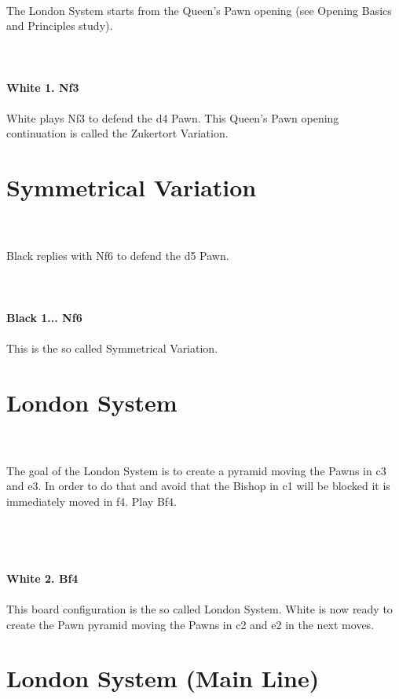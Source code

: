 \documentclass{article}
\begin{document}
\\
The London System starts from the Queen's Pawn opening (see Opening Basics and Principles study).\\
\\

\\
\\
\textbf{White 1. Nf3}\\
\\
White plays Nf3 to defend the d4 Pawn. This Queen's Pawn opening continuation is called the Zukertort Variation.\section{ Symmetrical Variation}

\\
\\
Black replies with Nf6 to defend the d5 Pawn.\\
\\

\\
\\
\textbf{Black 1... Nf6}\\
\\
This is the so called Symmetrical Variation.\section{ London System}

\\
\\
The goal of the London System is to create a pyramid moving the Pawns in c3 and e3. In order to do that and avoid that the Bishop in c1 will be blocked it is immediately moved in f4. Play Bf4.\\\\
\\

\\
\\
\textbf{White 2. Bf4}\\
\\
This board configuration is the so called London System. White is now ready to create the Pawn pyramid moving the Pawns in c2 and e2 in the next moves.\\\section{ London System (Main Line)}
\end{document}

